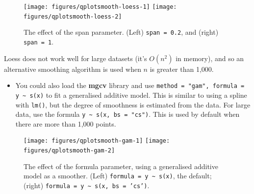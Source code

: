 \begin{figure}

{\centering \texttt{[image: figures/qplotsmooth-loess-1]} \texttt{[image: figures/qplotsmooth-loess-2]} 

}

\caption{The effect of the span parameter.  (Left) \texttt{span = 0.2}, and (right) \texttt{span = 1}.\label{fig:smooth-loess}}
\end{figure}

\noindent Loess does not work well for large datasets (it's \(O(n^2)\)
in memory), and so an alternative smoothing algorithm is used when \(n\)
is greater than 1,000.

\begin{itemize}
\itemsep1pt\parskip0pt
\item
  You could also load the \textbf{mgcv} library and use
  \texttt{method = "gam", formula = y \textasciitilde{} s(x)} to fit a
  generalised additive model. This is similar to using a spline with
  \texttt{lm()}, but the degree of smoothness is estimated from the
  data. For large data, use the formula
  \texttt{y \textasciitilde{} s(x, bs = "cs")}. This is used by default
  when there are more than 1,000 points. 
\end{itemize}

\begin{Shaded}
\begin{Highlighting}[]
  \NormalTok{(}\NormalTok{, }\NormalTok{), }
   \NormalTok{, } \StringTok{ }
  \NormalTok{(}\NormalTok{, }\NormalTok{), }
   \NormalTok{, } \StringTok{ } \NormalTok{))}
\end{Highlighting}
\end{Shaded}

\begin{figure}

{\centering \texttt{[image: figures/qplotsmooth-gam-1]} \texttt{[image: figures/qplotsmooth-gam-2]} 

}

\caption{The effect of the formula parameter, using a generalised additive model as a smoother.  (Left) \texttt{formula = y \textasciitilde{} s(x)}, the default; (right) \texttt{formula = y \textasciitilde{} s(x, bs = 'cs')}.\label{fig:smooth-gam}}
\end{figure}

